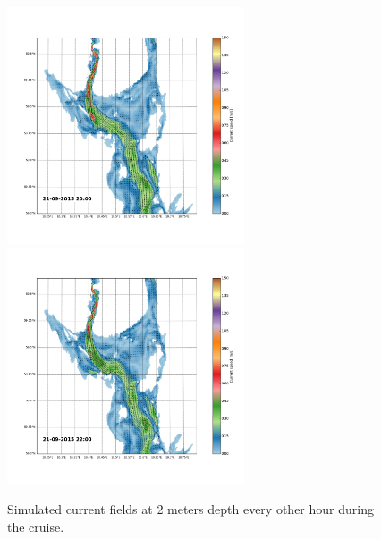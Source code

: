 \documentclass[12pt,a4paper,english]{article}
\begin{document}
\begin{figure}[h]
{}
\centerline{
\includegraphics*[trim=2.0cm 3cm 6.0cm 3.5cm,clip=true,height=7cm]{Python/stromfelt_78}
\includegraphics*[trim=3.7cm 3cm 1.3cm 3.5cm,clip=true,height=7cm]{Python/stromfelt_80}
}
\caption{\small
Simulated current fields at 2 meters depth every other hour during the cruise.}
\label{fig:Current1}
\end{figure}
\end{document}
